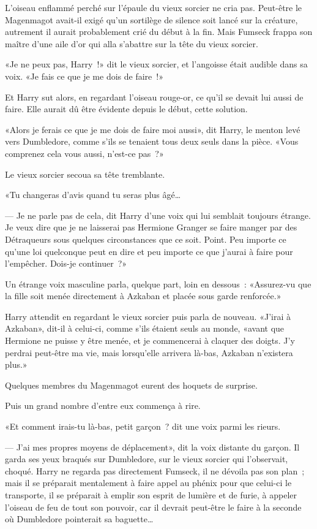 L'oiseau enflammé perché sur l'épaule du vieux sorcier ne cria pas. Peut-être le Magenmagot avait-il exigé qu'un sortilège de silence soit lancé sur la créature, autrement il aurait probablement crié du début à la fin. Mais Fumseck frappa son maître d'une aile d'or qui alla s'abattre sur la tête du vieux sorcier.

«Je ne peux pas, Harry~!» dit le vieux sorcier, et l'angoisse était audible dans sa voix. «Je fais ce que je me dois de faire~!»

Et Harry sut alors, en regardant l'oiseau rouge-or, ce qu'il se devait lui aussi de faire. Elle aurait dû être évidente depuis le début, cette solution.

«Alors je ferais ce que je me dois de faire moi aussi», dit Harry, le menton levé vers Dumbledore, comme s'ils se tenaient tous deux seuls dans la pièce. «Vous comprenez cela vous aussi, n'est-ce pas~?»

Le vieux sorcier secoua sa tête tremblante.

«Tu changeras d'avis quand tu seras plus âgé…

--- Je ne parle pas de cela, dit Harry d'une voix qui lui semblait toujours étrange. Je veux dire que je ne laisserai pas Hermione Granger se faire manger par des Détraqueurs sous quelques circonstances que ce soit. Point. Peu importe ce qu'une loi quelconque peut en dire et peu importe ce que j'aurai à faire pour l'empêcher. Dois-je continuer~?»

Un étrange voix masculine parla, quelque part, loin en dessous~: «Assurez-vu que la fille soit menée directement à Azkaban et placée sous garde renforcée.»

Harry attendit en regardant le vieux sorcier puis parla de nouveau. «J'irai à Azkaban», dit-il à celui-ci, comme s'ils étaient seuls au monde, «avant que Hermione ne puisse y être menée, et je commencerai à claquer des doigts. J'y perdrai peut-être ma vie, mais lorsqu'elle arrivera là-bas, Azkaban n'existera plus.»

Quelques membres du Magenmagot eurent des hoquets de surprise.

Puis un grand nombre d'entre eux commença à rire.

«Et comment irais-tu là-bas, petit garçon~? dit une voix parmi les rieurs.

--- J'ai mes propres moyens de déplacement», dit la voix distante du garçon. Il garda ses yeux braqués sur Dumbledore, sur le vieux sorcier qui l'observait, choqué. Harry ne regarda pas directement Fumseck, il ne dévoila pas son plan~; mais il se préparait mentalement à faire appel au phénix pour que celui-ci le transporte, il se préparait à emplir son esprit de lumière et de furie, à appeler l'oiseau de feu de tout son pouvoir, car il devrait peut-être le faire à la seconde où Dumbledore pointerait sa baguette…

